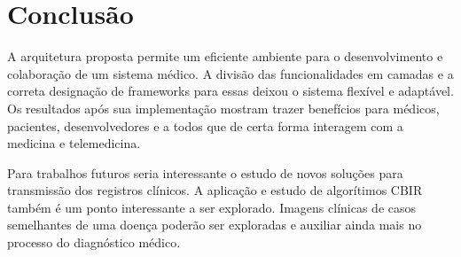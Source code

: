 \section{\esp Conclusão}

A arquitetura proposta permite um eficiente ambiente para o desenvolvimento e colaboração de um sistema médico. A divisão das funcionalidades em camadas e a correta designação de frameworks para essas deixou o sistema flexível e adaptável. Os resultados após sua implementação mostram trazer benefícios para médicos, pacientes, desenvolvedores e a todos que de certa forma interagem com a medicina e telemedicina.

Para trabalhos futuros seria interessante o estudo de novos soluções para transmissão dos registros clínicos. A aplicação e estudo de algorítimos CBIR também é um ponto interessante a ser explorado. Imagens clínicas de casos semelhantes de uma doença poderão ser exploradas e auxiliar ainda mais no processo do diagnóstico médico.


% 
